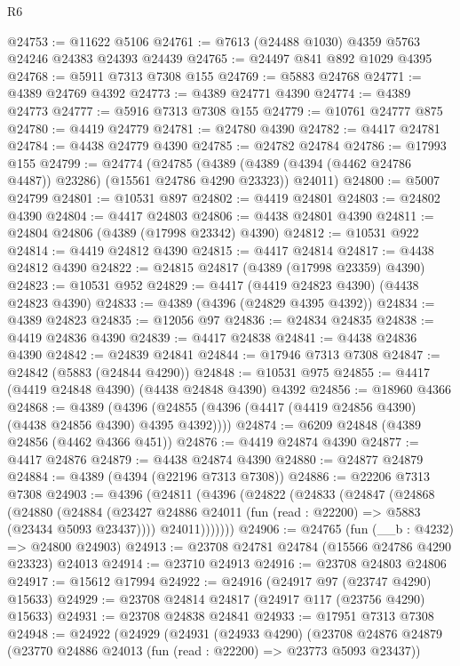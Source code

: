 \begin{lexlean}{R6}
\begin{coremodule}
@24753 := @11622 @5106
@24761 := @7613 (@24488 @1030) @4359 @5763 @24246 @24383 @24393 @24439
@24765 := @24497 @841 @892 @1029 @4395
@24768 := @5911 @7313 @7308 @155
@24769 := @5883 @24768
@24771 := @4389 @24769 @4392
@24773 := @4389 @24771 @4390
@24774 := @4389 @24773
@24777 := @5916 @7313 @7308 @155
@24779 := @10761 @24777 @875
@24780 := @4419 @24779
@24781 := @24780 @4390
@24782 := @4417 @24781
@24784 := @4438 @24779 @4390
@24785 := @24782 @24784
@24786 := @17993 @155
@24799 := @24774
    (@24785 (@4389 (@4389 (@4394 (@4462 @24786 @4487)) @23286) (@15561 @24786 @4290 @23323)) @24011)
@24800 := @5007 @24799
@24801 := @10531 @897
@24802 := @4419 @24801
@24803 := @24802 @4390
@24804 := @4417 @24803
@24806 := @4438 @24801 @4390
@24811 := @24804 @24806 (@4389 (@17998 @23342) @4390)
@24812 := @10531 @922
@24814 := @4419 @24812 @4390
@24815 := @4417 @24814
@24817 := @4438 @24812 @4390
@24822 := @24815 @24817 (@4389 (@17998 @23359) @4390)
@24823 := @10531 @952
@24829 := @4417 (@4419 @24823 @4390) (@4438 @24823 @4390)
@24833 := @4389 (@4396 (@24829 @4395 @4392))
@24834 := @4389 @24823
@24835 := @12056 @97
@24836 := @24834 @24835
@24838 := @4419 @24836 @4390
@24839 := @4417 @24838
@24841 := @4438 @24836 @4390
@24842 := @24839 @24841
@24844 := @17946 @7313 @7308
@24847 := @24842 (@5883 (@24844 @4290))
@24848 := @10531 @975
@24855 := @4417 (@4419 @24848 @4390) (@4438 @24848 @4390) @4392
@24856 := @18960 @4366
@24868 := @4389
    (@4396 (@24855 (@4396 (@4417 (@4419 @24856 @4390) (@4438 @24856 @4390) @4395 @4392))))
@24874 := @6209 @24848 (@4389 @24856 (@4462 @4366 @451))
@24876 := @4419 @24874 @4390
@24877 := @4417 @24876
@24879 := @4438 @24874 @4390
@24880 := @24877 @24879
@24884 := @4389 (@4394 (@22196 @7313 @7308))
@24886 := @22206 @7313 @7308
@24903 := @4396
    (@24811
      (@4396
        (@24822
          (@24833
            (@24847
              (@24868
                (@24880
                  (@24884
                    (@23427 @24886 @24011 (fun (read : @22200) => @5883 (@23434 @5093 @23437))))
                  @24011)))))))
@24906 := @24765 (fun (__b : @4232) => @24800 @24903)
@24913 := @23708 @24781 @24784 (@15566 @24786 @4290 @23323) @24013
@24914 := @23710 @24913
@24916 := @23708 @24803 @24806
@24917 := @15612 @17994
@24922 := @24916 (@24917 @97 (@23747 @4290) @15633)
@24929 := @23708 @24814 @24817 (@24917 @117 (@23756 @4290) @15633)
@24931 := @23708 @24838 @24841
@24933 := @17951 @7313 @7308
@24948 := @24922
    (@24929
      (@24931
        (@24933 @4290)
        (@23708
          @24876
          @24879
          (@23770 @24886 @24013 (fun (read : @22200) => @23773 @5093 @23437))

\end{coremodule}
\end{lexlean}
